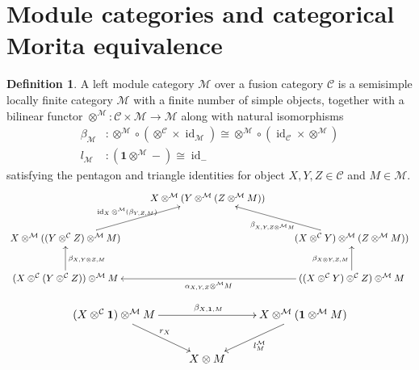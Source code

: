 \documentclass[a4paper, 10pt]{book}
\theoremstyle{definition}
\newtheorem{Def}[theorem]{Definition}
\numberwithin{equation}{chapter}
\newcommand\id{\operatorname{id}}
\newcommand\M{\mathcal{M}}
\newcommand\C{\mathcal C}
\newcommand{\ra}\rightarrow
\newcommand\one{\mathbf{1}}
\begin{document}
\section{Module categories and categorical Morita equivalence}\label{section:module-categories}
\begin{Def}\rm\label{modulecategorydef}
A left module category $\M$ over a fusion category $\C$ is a semisimple locally finite category $\M$ with a finite number of simple objects,  together with a bilinear functor $\otimes^{\M}: \C\times \M\ra \M$ along with natural isomorphisms \begin{align}
	\beta_\M &: \otimes^{\M} \circ (\otimes ^{\C} \times \id_{\M})\cong  \otimes^{\M} \circ (\id_{\C} \times \otimes^{\M})\\
	l_\M &: (\one \otimes^{\M} - ) \cong \id_{-}
\end{align}
satisfying the pentagon and triangle identities for object $X, Y, Z \in \C$ and $M\in \M$.
\[
  \xymatrix{&  X\otimes^\M (Y\otimes^\M (Z \otimes^\M M)) & \\ 
  X\otimes^\M ((Y\otimes^\C Z) \otimes^\M M) \ar[ru]^{\id_X \otimes^\M (\beta_{Y, Z, M})} &  & (X\otimes^\C Y)\otimes^\M (Z \otimes^\M M))\ar[lu]^{\beta_{X, Y, Z\otimes^\M M}}\\ 
  (X\otimes^\C (Y\otimes^\C Z)) \otimes^\M M \ar[u]_{\beta_{X, Y\otimes Z, M}} &  &  \ar[ll]^{\alpha_{X, Y, Z}\otimes^\M M} ((X\otimes^\C Y)\otimes^\C Z) \otimes^\M M\ar[u]^{\beta_{X\otimes Y, Z, M}} }
\]
\[
\xymatrix{(X\otimes^\C \one) \otimes^\M M \ar[rr]^{\beta_{X, \one, M}}\ar[dr]^{r_X} && X\otimes^\M(\one \otimes^\M M)\ar[dl]^{l^\M_M}\\
& X\otimes M }
\]
\end{Def}
\end{document}
